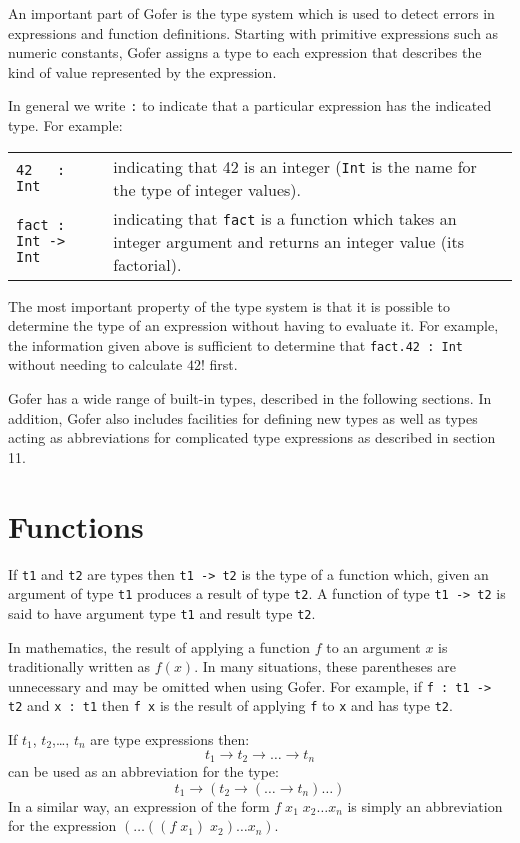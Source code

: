 An important part of Gofer is the type system which is used  to  detect
errors  in  expressions  and  function  definitions.    Starting   with
primitive expressions such as numeric constants, Gofer assigns  a  type
to each expression that describes the kind of value represented by  the
expression.

In  general  we write   \verb":" 
to indicate  that  a  particular
expression has the indicated type.  For example:
\BQ
\begin{tabular}{lp{8cm}}
    \verb"42   : Int" &   indicating that  42  is an  integer 
                           (\verb"Int" is the
                            name for the type of integer values).\\
    \verb"fact : Int -> Int" &  indicating  that  \verb"fact"  
                         is a  function  which
                        takes  an  integer  argument  and  returns   an
                        integer value (its factorial).
\end{tabular}
\EQ
The most important property of the type system is that it  is  possible
to determine the type of an expression without having to  evaluate  it.
For example, the information given above  is  sufficient  to  determine
that \verb"fact.42 : Int" without needing to calculate $42!$ first.

Gofer has a wide range of built-in types, described  in  the  following
sections.  In addition, Gofer also includes facilities for defining new
types as well as types acting as  abbreviations  for  complicated  type
expressions as described in section 11.


\section{Functions}
If \verb"t1" and \verb"t2" are types then \verb"t1 -> t2" 
is the type of a  function  which,
given an argument of type \verb"t1" produces a result of type \verb"t2".
A  function
of type \verb"t1 -> t2" is said to have argument type \verb"t1"
and result type \verb"t2".

In mathematics, the result of applying a function $f$ to an argument $x$ is
traditionally written as $f(x)$.  In many situations,  these  parentheses
are unnecessary and may be omitted when using Gofer.
For example, if \verb"f : t1 -> t2" and \verb"x : t1"
then \verb"f x" is the result of applying
\verb"f" to \verb"x" and has type \verb"t2".


If $t_1$, $t_2$,\dots , $t_n$ are type expressions then:
\[
  t_1 \to t_2 \to \dots \to t_n
\]
can be used as an abbreviation for the type:
\[
  t_1 \to (t_2 \to ( \dots \to t_n) \dots ) 
\]
In a similar way, an expression of the form 
$f\; x_1\; x_2 \dots x_n$ is simply an
abbreviation for the expression 
$(\dots ((f\; x_1)\; x_2) \dots x_n)$.

